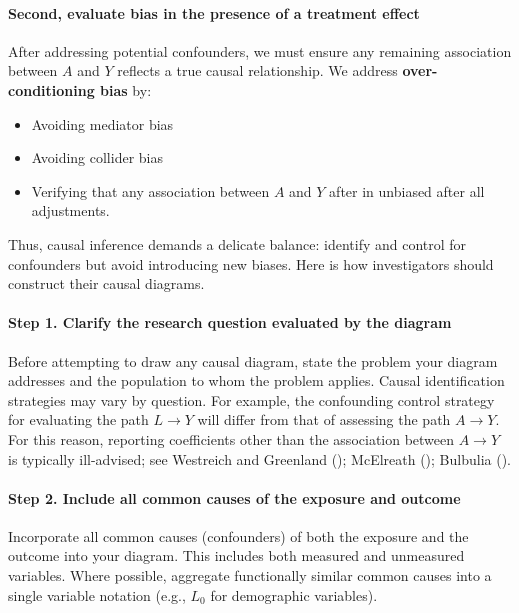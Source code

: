 \documentclass[
  singlecolumn]{article}
\let\oldparagraph\paragraph
\renewcommand{\paragraph}[1]{\oldparagraph{#1}\mbox{}}
\providecommand{\tightlist}{%
  \setlength{\itemsep}{0pt}\setlength{\parskip}{0pt}}\usepackage{longtable,booktabs,array}
\begin{document}
\paragraph{Second, evaluate bias in the presence of a treatment
effect}\label{second-evaluate-bias-in-the-presence-of-a-treatment-effect}

After addressing potential confounders, we must ensure any remaining
association between \(A\) and \(Y\) reflects a true causal relationship.
We address \textbf{over-conditioning bias} by:

\begin{itemize}
\tightlist
\item
  Avoiding mediator bias
\item
  Avoiding collider bias
\item
  Verifying that any association between \(A\) and \(Y\) after in
  unbiased after all adjustments.
\end{itemize}

Thus, causal inference demands a delicate balance: identify and control
for confounders but avoid introducing new biases. Here is how
investigators should construct their causal diagrams.

\paragraph{Step 1. Clarify the research question evaluated by the
diagram}\label{step-1.-clarify-the-research-question-evaluated-by-the-diagram}

Before attempting to draw any causal diagram, state the problem your
diagram addresses and the population to whom the problem applies. Causal
identification strategies may vary by question. For example, the
confounding control strategy for evaluating the path \(L\to Y\) will
differ from that of assessing the path \(A\to Y\). For this reason,
reporting coefficients other than the association between \(A \to Y\) is
typically ill-advised; see Westreich and Greenland
(); McElreath
(); Bulbulia
().

\paragraph{Step 2. Include all common causes of the exposure and
outcome}\label{step-2.-include-all-common-causes-of-the-exposure-and-outcome}

Incorporate all common causes (confounders) of both the exposure and the
outcome into your diagram. This includes both measured and unmeasured
variables. Where possible, aggregate functionally similar common causes
into a single variable notation (e.g., \(L_0\) for demographic
variables).
\end{document}
